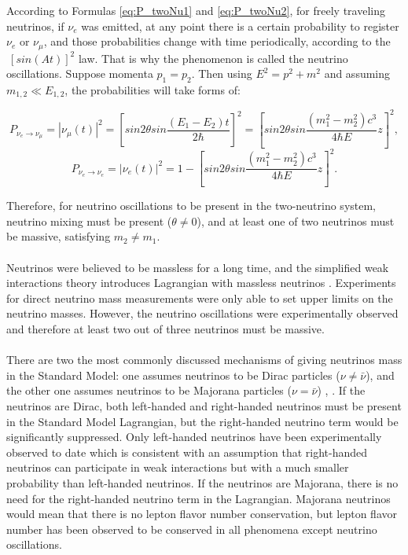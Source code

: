 According to Formulas \ref{eq:P_twoNu1} and \ref{eq:P_twoNu2}, for freely traveling neutrinos, if $\nu_e$ was emitted, at any point there is a certain probability to register $\nu_e$ or $\nu_\mu$, and those probabilities change with time periodically, according to the $~[sin(At)]^2$ law. That is why the phenomenon is called the neutrino oscillations.
Suppose momenta $p_1=p_2$. Then using $E^2=p^2+m^2$ and assuming $m_{1,2}\ll E_{1,2}$, the probabilities will take forms of:\\
\begin{center}
\begin{equation}
\label{eq:P_twoNu3}
P_{\nu_e \rightarrow \nu_\mu}=|\nu_\mu(t)|^2=[{sin2\theta}sin{\frac{(E_1-E_2)t}{2\hbar}}]^2=[{sin2\theta}sin{\frac{(m_1^2-m_2^2)c^3}{4\hbar{E}}z}]^2,
\end{equation}
\begin{equation}
\label{eq:P_twoNu4}
P_{\nu_e \rightarrow \nu_e}=|\nu_e(t)|^2=1-[{sin2\theta}sin{\frac{(m_1^2-m_2^2)c^3}{4\hbar{E}}z}]^2.
\end{equation}
\end{center}
Therefore, for neutrino oscillations to be present in the two-neutrino system,  neutrino mixing must be present ($\theta \neq 0$), and at least one of two neutrinos must be massive, satisfying $m_2 \neq m_1$.\\ \\
Neutrinos were believed to be massless for a long time, and the simplified weak interactions theory introduces Lagrangian with massless neutrinos \cite{ref_Griffiths}. Experiments for direct neutrino mass measurements were only able to set upper limits on the neutrino masses. However, the neutrino oscillations were experimentally observed and therefore at least two out of three neutrinos must be massive. \\ \\
There are two the most commonly discussed mechanisms of giving neutrinos mass in the Standard Model: one assumes neutrinos to be Dirac particles ($\nu \neq \bar{\nu}$), and the other one assumes neutrinos to be Majorana particles ($\nu = \bar{\nu}$) \cite{ref_PDG}, \cite{ref_theory_Osc}. If the neutrinos are Dirac, both left-handed and right-handed neutrinos must be present in the Standard Model Lagrangian, but the right-handed neutrino term would be significantly suppressed. Only left-handed neutrinos have been experimentally observed to date which is consistent with an assumption that right-handed neutrinos can participate in weak interactions but with a much smaller probability than left-handed neutrinos. If the neutrinos are Majorana, there is no need for the right-handed neutrino term in the Lagrangian. Majorana neutrinos would mean that there is no lepton flavor number conservation, but lepton flavor number has been observed to be conserved in all phenomena except neutrino oscillations. \\ \\
